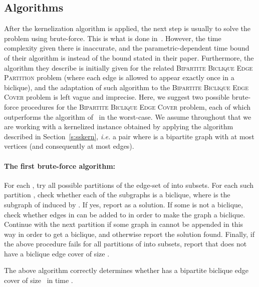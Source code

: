 \subsection{Algorithms}\label{s:sssa}

After the kernelization algorithm is applied, the next step
is usually to solve the problem using brute-force. This is what is done
in~\cite{FleischnerMujuniPaulusmaSzeider2009}. However, the
time complexity given there is inaccurate, and the
parametric-dependent time bound of their algorithm is
 instead of the  bound 
stated in their paper. Furthermore, the algorithm they describe is
initially given for the related \textsc{Bipartite Biclique Edge
  Partition} problem (where each edge is allowed to appear exactly once in a
biclique), and the adaptation of such algorithm to the \textsc{Bipartite Biclique
Edge Cover} problem is left vague and imprecise.
Here, we suggest two possible brute-force procedures for the \textsc{Bipartite Biclique
Edge Cover} problem, each of which outperforms the algorithm
of~\cite{FleischnerMujuniPaulusmaSzeider2009} in the worst-case. We assume
throughout that we are working
with a kernelized instance obtained by applying the algorithm described in Section~\ref{s:sskern}, \emph{i.e.} a pair  where  is a bipartite graph with
at most  vertices (and consequently at most  edges).

\paragraph{The first brute-force algorithm:}
For each , try all possible partitions of the
edge-set  of  into  subsets. For each such
partition , check whether each of the
subgraphs  is a biclique, where
 is the subgraph of  induced by . If yes, report
 as a solution. If some  is
not a biclique, check whether edges in 
can be added to  in order to make the graph a biclique.
Continue with the next partition if some graph in
 cannot be appended in this way in
order to get a biclique, and otherwise report the solution
found. Finally, if the above procedure fails for all partitions
of  into  subsets, report that  does not have a
biclique edge cover of size .

\begin{lemma}
\label{Lemma: Correctness}
The above algorithm correctly determines whether  has a
bipartite biclique edge cover of size~ in time
.
\end{lemma}

